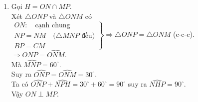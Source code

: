 \begin{vn}
{\begin{enumerate}
Xét $\triangle OBP$ và $\triangle OCM$ có \\
$\left. 
\begin{array}{l} 
OB=OC\\
\widehat{OBP}=\widehat{OCM} \quad \text{(cmt)}\\
BP=CM
\end{array} 
\right\} \Rightarrow \triangle OBP= \triangle OCM$ (c-g-c).\\
$\Rightarrow OM = OP$.
\item Gọi $H=ON \cap MP$.\\
Xét $\triangle ONP$ và $\triangle ONM$ có \\
$\left. 
\begin{array}{l} 
ON: \quad \text{cạnh chung} \\
NP=NM \quad (\triangle MNP \text{ đều)}\\
BP=CM
\end{array} 
\right\} \Rightarrow \triangle ONP =\triangle ONM$ (c-c-c).\\
$\Rightarrow \widehat{ONP}=\widehat{ONM}$.\\
Mà $\widehat{MNP}=60^{\circ}$.\\
Suy ra $\widehat{ONP}=\widehat{ONM}=30^{\circ}$.\\ 
Ta có $\widehat{ONP}+\widehat{NPH}= 30^{\circ}+60^{\circ}=90^{\circ}$ suy ra $\widehat{NHP}=90^{\circ}$.\\
Vậy $ON \perp MP$.
\end{enumerate}
}
\end{vn}

